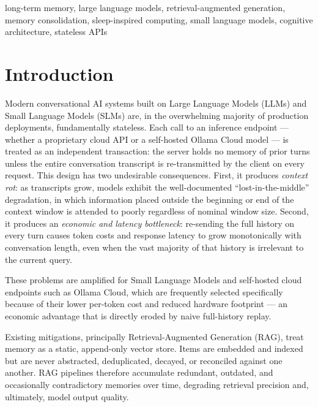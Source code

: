\documentclass[conference]{IEEEtran}
\begin{document}
\begin{abstract}
biologically-motivated offline consolidation can substitute for raw context replay, improving both correctness and efficiency in stateless LLM deployments.
\end{abstract}

\begin{IEEEkeywords}
long-term memory, large language models, retrieval-augmented generation, memory consolidation, sleep-inspired computing, small language models, cognitive architecture, stateless APIs
\end{IEEEkeywords}

\section{Introduction}

Modern conversational AI systems built on Large Language Models (LLMs) and Small Language Models (SLMs) are, in the overwhelming majority of production deployments, fundamentally stateless. Each call to an inference endpoint --- whether a proprietary cloud API or a self-hosted Ollama Cloud model --- is treated as an independent transaction: the server holds no memory of prior turns unless the entire conversation transcript is re-transmitted by the client on every request. This design has two undesirable consequences. First, it produces \emph{context rot}: as transcripts grow, models exhibit the well-documented ``lost-in-the-middle'' degradation, in which information placed outside the beginning or end of the context window is attended to poorly regardless of nominal window size. Second, it produces an \emph{economic and latency bottleneck}: re-sending the full history on every turn causes token costs and response latency to grow monotonically with conversation length, even when the vast majority of that history is irrelevant to the current query.

These problems are amplified for Small Language Models and self-hosted cloud endpoints such as Ollama Cloud, which are frequently selected specifically because of their lower per-token cost and reduced hardware footprint --- an economic advantage that is directly eroded by naive full-history replay.

Existing mitigations, principally Retrieval-Augmented Generation (RAG), treat memory as a static, append-only vector store. Items are embedded and indexed but are never abstracted, deduplicated, decayed, or reconciled against one another. RAG pipelines therefore accumulate redundant, outdated, and occasionally contradictory memories over time, degrading retrieval precision and, ultimately, model output quality.
\end{document}
